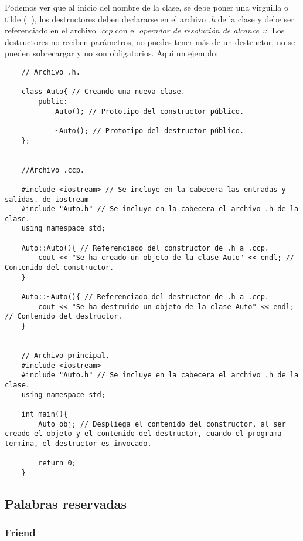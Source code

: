 Podemos ver que al inicio del nombre de la clase, se debe poner una virguilla o tilde (\textbf{~}), los destructores deben declararse en el archivo \textit{.h} de la clase y debe ser referenciado en el archivo \textit{.ccp} con el \textit{operador de resolución de alcance ::}. Los destructores no reciben parámetros, no puedes tener más de un destructor, no se pueden sobrecargar y no son obligatorios. Aquí un ejemplo:
\begin{lstlisting}
    // Archivo .h.
    
    class Auto{ // Creando una nueva clase.
        public:
            Auto(); // Prototipo del constructor público.
            
            ~Auto(); // Prototipo del destructor público.
    };

    
    //Archivo .ccp.
    
    #include <iostream> // Se incluye en la cabecera las entradas y salidas. de iostream
    #include "Auto.h" // Se incluye en la cabecera el archivo .h de la clase.
    using namespace std;
    
    Auto::Auto(){ // Referenciado del constructor de .h a .ccp.
        cout << "Se ha creado un objeto de la clase Auto" << endl; // Contenido del constructor.
    }
    
    Auto::~Auto(){ // Referenciado del destructor de .h a .ccp.
        cout << "Se ha destruido un objeto de la clase Auto" << endl; // Contenido del destructor.
    }

    
    // Archivo principal.
    #include <iostream>
    #include "Auto.h" // Se incluye en la cabecera el archivo .h de la clase.
    using namespace std;
    
    int main(){
        Auto obj; // Despliega el contenido del constructor, al ser creado el objeto y el contenido del destructor, cuando el programa termina, el destructor es invocado.
        
        return 0;
    }
\end{lstlisting}


\subsection{Palabras reservadas}


\subsubsection{Friend}

